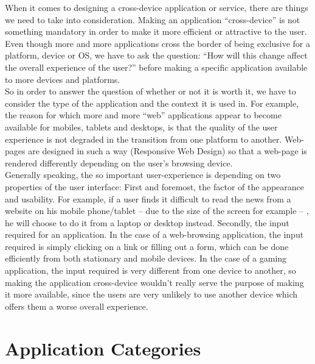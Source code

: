    When it comes to designing a cross-device application or service, there are things we need to take into consideration. Making an application “cross-device” is not something mandatory in order to make it more efficient or attractive to the user. Even though more and more applications cross the border of being exclusive for a platform, device or OS, we have to ask the question: “How will this change affect the overall experience of the user?” before making a specific application available to more devices and platforms.
\\   So in order to answer the question of whether or not it is worth it, we have to consider the type of the application and the context it is used in. For example, the reason for which more and more “web” applications appear to become available for mobiles, tablets and desktops, is that the quality of the user experience is not degraded in the transition from one platform to another. Web-pages are designed in such a way (Responsive Web Design) so that a web-page is rendered differently depending on the user's browsing device. 
\\ Generally speaking, the so important user-experience is depending on two properties of the user interface: First and foremost, the factor of the appearance and usability. For example, if a user finds it difficult to read the news from a website on his mobile phone/tablet – due to the size of the screen for example – , he will choose to do it from a laptop or desktop instead. Secondly, the input required for an application. In the case of a web-browsing application, the input required is simply clicking on a link or filling out a form, which can be done efficiently from both stationary and mobile devices. In the case of a gaming application, the input required is very different from one device to another, so making the application cross-device wouldn't really serve the purpose of making it more available, since the users are very unlikely to use another device which offers them a worse overall experience.


\section{Application Categories}
